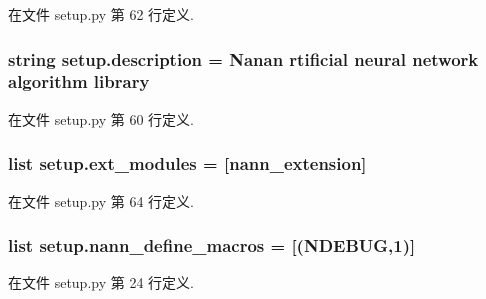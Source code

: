 在文件 setup.\+py 第 62 行定义.

\hypertarget{namespacesetup_ade8aa54df2083113a10326ea2fe7934b}{}
\subsubsection[{description}]{\setlength{\rightskip}{0pt plus 5cm}string setup.\+description = \textquotesingle{}Nanan rtificial neural network algorithm library\textquotesingle{}}\label{namespacesetup_ade8aa54df2083113a10326ea2fe7934b}


在文件 setup.\+py 第 60 行定义.

\hypertarget{namespacesetup_a657516be9ed3c70ce05f5f6918206934}{}
\subsubsection[{ext\+\_\+modules}]{\setlength{\rightskip}{0pt plus 5cm}list setup.\+ext\+\_\+modules = \mbox{[}{\bf nann\+\_\+extension}\mbox{]}}\label{namespacesetup_a657516be9ed3c70ce05f5f6918206934}


在文件 setup.\+py 第 64 行定义.

\hypertarget{namespacesetup_a707ac5d361a916ed078172866c82b945}{}
\subsubsection[{nann\+\_\+define\+\_\+macros}]{\setlength{\rightskip}{0pt plus 5cm}list setup.\+nann\+\_\+define\+\_\+macros = \mbox{[}(\textquotesingle{}N\+D\+E\+B\+U\+G\textquotesingle{},\textquotesingle{}1\textquotesingle{})\mbox{]}}\label{namespacesetup_a707ac5d361a916ed078172866c82b945}


在文件 setup.\+py 第 24 行定义.

\hypertarget{namespacesetup_aebabf02abf54d1e0cd11949d52c28be5}{}
